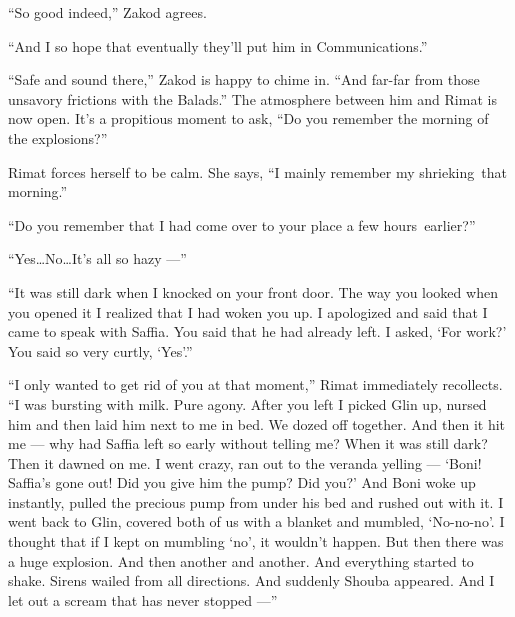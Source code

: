 \documentclass[twoside,11pt]{book}
\begin{document}
``So good indeed,'' Zakod agrees.

``And I so hope that eventually they'll put him in Communications.''

``Safe and sound there,'' Zakod is happy to chime in. ``And far-far from those
unsavory frictions with the Balads.'' The atmosphere between him and Rimat is now open. It's a propitious
moment to ask, ``Do you remember the morning of the explosions?''

Rimat forces herself to be calm. She says, ``I mainly remember my shrieking~that morning.''

``Do you remember that I had come over to your place a few hours~earlier?''

``Yes{\ldots}No{\ldots}It's all so hazy ---''

``It was still dark when I knocked on your front door. The way you looked when you opened it I realized
that I had woken you up. I apologized and said that I came to speak with Saffia. You said that he had already left. I
asked, `For work?' You said so very curtly, `Yes'.''

``I only wanted to get rid of you at that moment,'' Rimat immediately recollects.
``I was bursting with milk. Pure agony. After you left I picked Glin up, nursed{ }him and
then laid him next to me in bed. We dozed off together. And then it hit me --- why had Saffia left so early without
telling me? When it was still dark? Then it dawned{ }on me. I went crazy, ran out to the veranda
yelling --- `Boni! Saffia's gone out! Did you give him the pump? Did you?' And Boni woke up instantly, pulled the
precious pump from under his bed and rushed out with it. I went back to Glin, covered both of us with a blanket and
mumbled, `No-no-no'. I thought that if I kept on mumbling `no', it wouldn't happen. But then there was a huge
explosion. And then another and another. And everything started to shake.  Sirens wailed from all directions. And
suddenly Shouba appeared. And I let out a scream that has never stopped ---''
\end{document}
